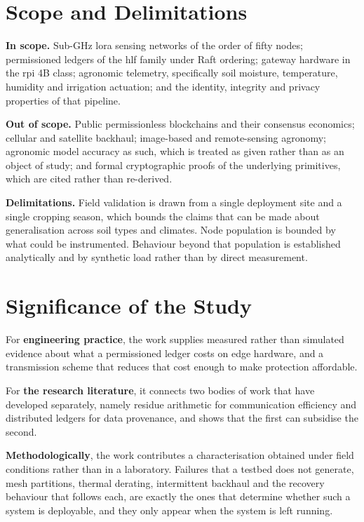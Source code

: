 \documentclass[12pt,a4paper,oneside]{book}
\begin{document}
\section{Scope and Delimitations}
\label{sec:scope}

\textbf{In scope.} Sub-GHz \gls{lora} sensing networks of the order of fifty
nodes; permissioned ledgers of the \gls{hlf} family under Raft ordering;
gateway hardware in the \gls{rpi} 4B class; agronomic telemetry, specifically
soil moisture, temperature, humidity and irrigation actuation; and the
identity, integrity and privacy properties of that pipeline.

\textbf{Out of scope.} Public permissionless blockchains and their consensus
economics; cellular and satellite backhaul; image-based and remote-sensing
agronomy; agronomic model accuracy as such, which is treated as given rather
than as an object of study; and formal cryptographic proofs of the underlying
primitives, which are cited rather than re-derived.

\textbf{Delimitations.} Field validation is drawn from a single deployment site
and a single cropping season, which bounds the claims that can be made about
generalisation across soil types and climates. Node population is bounded by
what could be instrumented. Behaviour beyond that population is established
analytically and by synthetic load rather than by direct measurement.

\section{Significance of the Study}
\label{sec:significance}

For \textbf{engineering practice}, the work supplies measured rather than
simulated evidence about what a permissioned ledger costs on edge hardware, and
a transmission scheme that reduces that cost enough to make protection
affordable.

For \textbf{the research literature}, it connects two bodies of work that have
developed separately, namely residue arithmetic for communication efficiency and
distributed ledgers for data provenance, and shows that the first can subsidise
the second.

\textbf{Methodologically}, the work contributes a characterisation obtained under
field conditions rather than in a laboratory. Failures that a testbed does not
generate, mesh partitions, thermal derating, intermittent backhaul and the
recovery behaviour that follows each, are exactly the ones that determine
whether such a system is deployable, and they only appear when the system is
left running.
\end{document}
